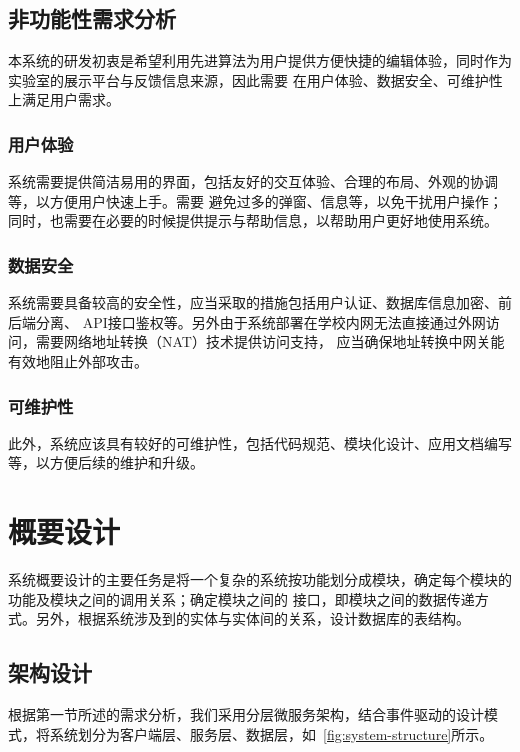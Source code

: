 \subsection{非功能性需求分析}

本系统的研发初衷是希望利用先进算法为用户提供方便快捷的编辑体验，同时作为实验室的展示平台与反馈信息来源，因此需要
在用户体验、数据安全、可维护性上满足用户需求。

\subsubsection{用户体验}

系统需要提供简洁易用的界面，包括友好的交互体验、合理的布局、外观的协调等，以方便用户快速上手。需要
避免过多的弹窗、信息等，以免干扰用户操作；同时，也需要在必要的时候提供提示与帮助信息，以帮助用户更好地使用系统。

\subsubsection{数据安全}

系统需要具备较高的安全性，应当采取的措施包括用户认证、数据库信息加密、前后端分离、
API接口鉴权等。另外由于系统部署在学校内网无法直接通过外网访问，需要网络地址转换（NAT）技术提供访问支持，
应当确保地址转换中网关能有效地阻止外部攻击。

\subsubsection{可维护性}
此外，系统应该具有较好的可维护性，包括代码规范、模块化设计、应用文档编写等，以方便后续的维护和升级。

\section{概要设计}

系统概要设计的主要任务是将一个复杂的系统按功能划分成模块，确定每个模块的功能及模块之间的调用关系；确定模块之间的
接口，即模块之间的数据传递方式。另外，根据系统涉及到的实体与实体间的关系，设计数据库的表结构。

\subsection{架构设计}

根据第一节所述的需求分析，我们采用分层微服务架构，结合事件驱动的设计模式，将系统划分为客户端层、服务层、数据层，如~\ref{fig:system-structure}所示。

